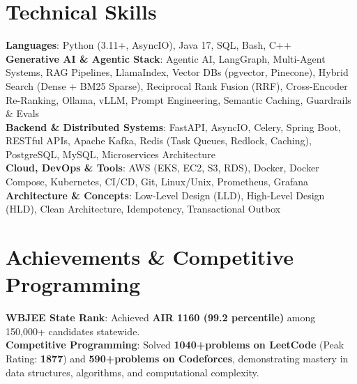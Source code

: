 \documentclass[letterpaper,10.5pt]{article}
\begin{document}
\section{Technical Skills}
 \begin{itemize}[leftmargin=0.15in, label={}]
    \small{\item{
     \textbf{Languages}: Python (3.11+, AsyncIO), Java 17, SQL, Bash, C++ \\
     \textbf{Generative AI \& Agentic Stack}: Agentic AI, LangGraph, Multi-Agent Systems, RAG Pipelines, LlamaIndex, Vector DBs (pgvector, Pinecone), Hybrid Search (Dense + BM25 Sparse), Reciprocal Rank Fusion (RRF), Cross-Encoder Re-Ranking, Ollama, vLLM, Prompt Engineering, Semantic Caching, Guardrails \& Evals \\
     \textbf{Backend \& Distributed Systems}: FastAPI, AsyncIO, Celery, Spring Boot, RESTful APIs, Apache Kafka, Redis (Task Queues, Redlock, Caching), PostgreSQL, MySQL, Microservices Architecture \\
     \textbf{Cloud, DevOps \& Tools}: AWS (EKS, EC2, S3, RDS), Docker, Docker Compose, Kubernetes, CI/CD, Git, Linux/Unix, Prometheus, Grafana \\
     \textbf{Architecture \& Concepts}: Low-Level Design (LLD), High-Level Design (HLD), Clean Architecture, Idempotency, Transactional Outbox
    }}
 \end{itemize}

\section{Achievements \& Competitive Programming}
 \begin{itemize}[leftmargin=0.15in, label={}]
    \small{\item{
     \textbf{WBJEE State Rank}: Achieved \textbf{AIR 1160 (99.2 percentile)} among 150,000+ candidates statewide. \\
     \textbf{Competitive Programming}: Solved \textbf{1040+\text{~}problems on LeetCode} (Peak Rating: \textbf{1877}) and \textbf{590+\text{~}problems on Codeforces}, demonstrating mastery in data structures, algorithms, and computational complexity.
    }}
 \end{itemize}
\end{document}
